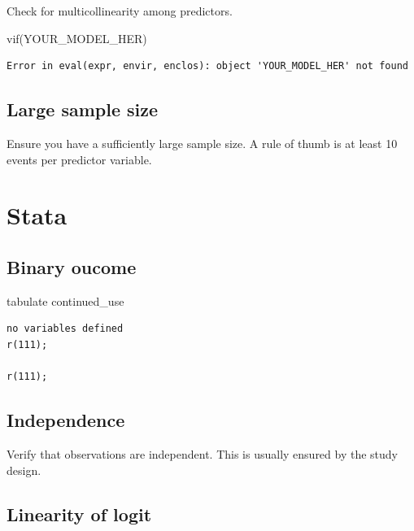 \documentclass[
  letterpaper,
  DIV=11,
  numbers=noendperiod]{scrreprt}
\newenvironment{Shaded}{\begin{snugshade}}{\end{snugshade}}
\newcommand{\FunctionTok}[1]{\textcolor[rgb]{0.28,0.35,0.67}{#1}}
\newcommand{\KeywordTok}[1]{\textcolor[rgb]{0.00,0.23,0.31}{#1}}
\newcommand{\NormalTok}[1]{\textcolor[rgb]{0.00,0.23,0.31}{#1}}
\begin{document}
Check for multicollinearity among predictors.

\begin{Shaded}
\begin{Highlighting}[]
\FunctionTok{vif}\NormalTok{(YOUR\_MODEL\_HER)}
\end{Highlighting}
\end{Shaded}

\begin{verbatim}
Error in eval(expr, envir, enclos): object 'YOUR_MODEL_HER' not found
\end{verbatim}

\subsection{Large sample size}\label{large-sample-size}

Ensure you have a sufficiently large sample size. A rule of thumb is at
least 10 events per predictor variable.

\section{Stata}\label{stata-3}

\subsection{Binary oucome}\label{binary-oucome-1}

\begin{Shaded}
\begin{Highlighting}[]
\KeywordTok{tabulate}\NormalTok{ continued\_use}
\end{Highlighting}
\end{Shaded}

\begin{verbatim}
no variables defined
r(111);

r(111);
\end{verbatim}

\subsection{Independence}\label{independence-1}

Verify that observations are independent. This is usually ensured by the
study design.

\subsection{Linearity of logit}\label{linearity-of-logit-1}
\end{document}
